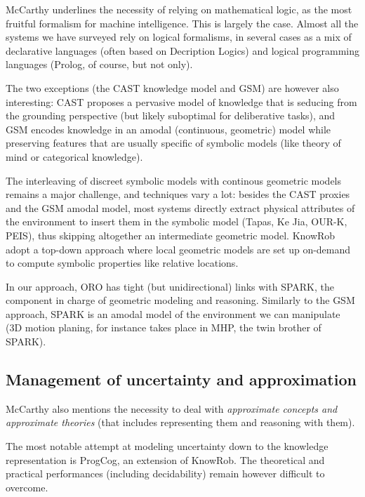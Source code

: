 McCarthy underlines the necessity of relying on mathematical logic, as the most
fruitful formalism for machine intelligence. This is largely the case. Almost
all the systems we have surveyed rely on logical formalisms, in several cases
as a mix of declarative languages (often based on Decription Logics) and
logical programming languages (Prolog, of course, but not only).

The two exceptions (the CAST knowledge model and GSM) are however also
interesting: CAST proposes a pervasive model of knowledge that is seducing from
the grounding perspective (but likely suboptimal for deliberative tasks), and
GSM encodes knowledge in an amodal (continuous, geometric) model while
preserving features that are usually specific of symbolic models (like theory
of mind or categorical knowledge).

The interleaving of discreet symbolic models with continous geometric models
remains a major challenge, and techniques vary a lot: besides the CAST proxies
and the GSM amodal model, most systems directly extract physical attributes of
the environment to insert them in the symbolic model ({\sc Tapas}, Ke Jia,
OUR-K, PEIS), thus skipping altogether an intermediate geometric model. {\sc KnowRob}
adopt a top-down approach where local geometric models are set up on-demand to
compute symbolic properties like relative locations.

In our approach, ORO has tight (but unidirectional) links with SPARK, the
component in charge of geometric modeling and reasoning. Similarly to the GSM
approach, SPARK is an amodal model of the environment we can manipulate (3D
motion planing, for instance takes place in MHP, the twin brother of SPARK).

\subsection{Management of uncertainty and approximation}

McCarthy also mentions the necessity to deal with \emph{approximate concepts
and approximate theories} (that includes representing them and reasoning with
them).

The most notable attempt at modeling uncertainty down to the knowledge
representation is {\sc ProgCog}, an extension of {\sc KnowRob}. The theoretical
and practical performances (including decidability) remain however difficult to
overcome.


